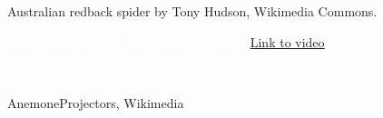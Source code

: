 \documentclass[t]{beamer}
\begin{document}
{
\begin{frame}



\tinyfill Australian redback spider by Tony Hudson, Wikimedia Commons.
\end{frame}
}


{
\begin{frame}




\vfilll

\tiny \textcolor{white}{Oliver Koemmerling, Wikimedia Commons.\hfill \href{https://www.youtube.com/watch?v=Os3OBJSlpUc}{Link to video} \hfill \phantom{.}} 

\end{frame}
}


{
\begin{frame}{\textcolor{white}{Does sexual selection occur in humans?}}


\tinyfill AnemoneProjectors, Wikimedia
\end{frame}
}


\end{document}
